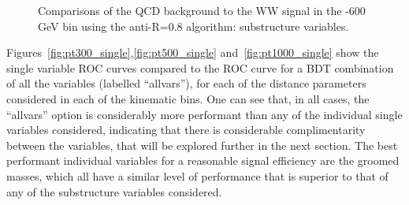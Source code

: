 \begin{figure}
\begin{center}
\caption{Comparisons of the QCD background to the WW signal in the -600 GeV bin using the anti-\kT R=0.8 algorithm:
  substructure variables.}
\label{fig:pt500_subst_AKt_R08}
\end{center}
\end{figure}


Figures~\ref{fig:pt300_single},\ref{fig:pt500_single}
and~\ref{fig:pt1000_single} show the single variable ROC curves
compared to the ROC curve for a BDT combination of all the variables
(labelled ``allvars''),
for each of the \antikt distance parameters considered in each of the
kinematic bins. One can see that, in all cases, the ``allvars'' option
is considerably more performant than any of the individual single variables
considered, indicating that there is considerable complimentarity
between the variables, that will be explored further in the next
section. The best performant individual variables for a reasonable signal
efficiency are the groomed masses, which all have a similar
level of performance that is superior to that of any of the
substructure variables considered. 





